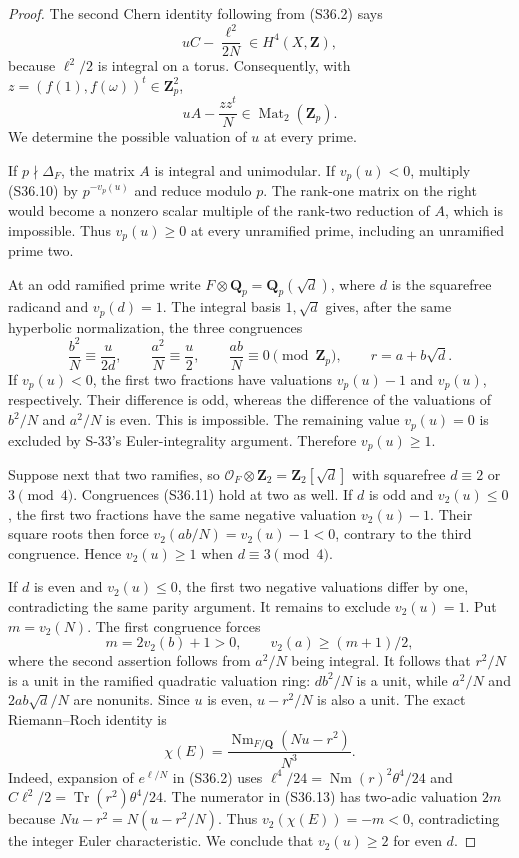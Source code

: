 \begin{proof}
The second Chern identity following from (S36.2) says
\[
 uC-\frac{\ell^2}{2N}\in H^4(X,\mathbf Z),
 \tag{S36.9}
\]
because $\ell^2/2$ is integral on a torus. Consequently,
with $z=(f(1),f(\omega))^t\in\mathbf Z_p^2$,
\[
 uA-\frac{zz^t}{N}\in\operatorname{Mat}_2(\mathbf Z_p).
 \tag{S36.10}
\]
We determine the possible valuation of $u$ at every prime.

If $p\nmid\Delta_F$, the matrix $A$ is integral and
unimodular. If $v_p(u)<0$, multiply (S36.10) by
$p^{-v_p(u)}$ and reduce modulo $p$. The rank-one
matrix on the right would become a nonzero scalar
multiple of the rank-two reduction of $A$, which is
impossible. Thus $v_p(u)\ge0$ at every unramified prime,
including an unramified prime two.

At an odd ramified prime write $F\otimes\mathbf Q_p
=\mathbf Q_p(\sqrt d)$, where $d$ is the squarefree
radicand and $v_p(d)=1$. The integral basis
$1,\sqrt d$ gives, after the same hyperbolic
normalization, the three congruences
\[
 \frac{b^2}{N}\equiv\frac{u}{2d},\qquad
 \frac{a^2}{N}\equiv\frac u2,\qquad
 \frac{ab}{N}\equiv0\pmod{\mathbf Z_p},
 \qquad r=a+b\sqrt d.
 \tag{S36.11}
\]
If $v_p(u)<0$, the first two fractions have valuations
$v_p(u)-1$ and $v_p(u)$, respectively. Their difference
is odd, whereas the difference of the valuations of
$b^2/N$ and $a^2/N$ is even. This is impossible.
The remaining value $v_p(u)=0$ is excluded by S-33's
Euler-integrality argument. Therefore $v_p(u)\ge1$.

Suppose next that two ramifies, so
$\mathcal O_F\otimes\mathbf Z_2=\mathbf Z_2[\sqrt d]$
with squarefree $d\equiv2$ or $3\pmod4$.
Congruences (S36.11) hold at two as well.
If $d$ is odd and $v_2(u)\le0$, the first two fractions
have the same negative valuation $v_2(u)-1$.
Their square roots then force
$v_2(ab/N)=v_2(u)-1<0$, contrary to the third congruence.
Hence $v_2(u)\ge1$ when $d\equiv3\pmod4$.

If $d$ is even and $v_2(u)\le0$, the first two
negative valuations differ by one, contradicting the
same parity argument. It remains to exclude
$v_2(u)=1$. Put $m=v_2(N)$. The first congruence
forces
\[
 m=2v_2(b)+1>0,
 \qquad v_2(a)\ge(m+1)/2,
 \tag{S36.12}
\]
where the second assertion follows from $a^2/N$ being
integral. It follows that $r^2/N$ is a unit in the
ramified quadratic valuation ring: $db^2/N$ is a unit,
while $a^2/N$ and $2ab\sqrt d/N$ are nonunits.
Since $u$ is even, $u-r^2/N$ is also a unit.
The exact Riemann--Roch identity is
\[
 \chi(E)=\frac{\operatorname{Nm}_{F/\mathbf Q}(Nu-r^2)}{N^3}.
 \tag{S36.13}
\]
Indeed, expansion of $e^{\ell/N}$ in (S36.2) uses
$\ell^4/24=\operatorname{Nm}(r)^2\theta^4/24$ and
$C\ell^2/2=\operatorname{Tr}(r^2)\theta^4/24$.
The numerator in (S36.13) has two-adic valuation $2m$
because $Nu-r^2=N(u-r^2/N)$. Thus $v_2(\chi(E))=-m<0$,
contradicting the integer Euler characteristic.
We conclude that $v_2(u)\ge2$ for even $d$.


\end{proof}

